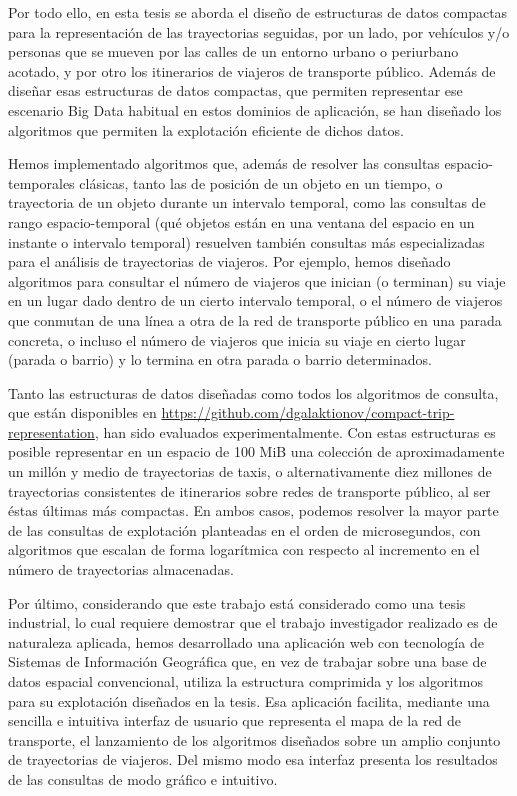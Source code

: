 Por todo ello, en esta tesis se aborda el dise\~no de estructuras de datos compactas para la representaci\'on de las trayectorias seguidas, por un lado, por veh\'iculos y/o personas que se mueven por las calles de un entorno urbano o periurbano acotado, y por otro los itinerarios de viajeros de transporte p\'ublico. Adem\'as de dise\~nar esas estructuras de datos compactas, que permiten representar ese escenario Big Data habitual en estos dominios de aplicaci\'on, se han dise\~nado los algoritmos que permiten la explotaci\'on eficiente de dichos datos.

Hemos implementado algoritmos que, adem\'as de resolver las consultas \mbox{espacio-temporales} cl\'asicas, tanto las de posici\'on de un objeto en un tiempo, o trayectoria de un objeto durante un intervalo temporal, como las consultas de rango \mbox{espacio-temporal} (qu\'e objetos est\'an en una ventana del espacio en un instante o intervalo temporal) resuelven tambi\'en consultas m\'as especializadas para el an\'alisis de trayectorias de viajeros. Por ejemplo, hemos dise\~nado algoritmos para  consultar el n\'umero de viajeros que inician (o terminan)  su viaje en un lugar dado dentro de un cierto intervalo temporal, o el n\'umero de viajeros que conmutan de una l\'inea a otra de la red de transporte p\'ublico en una parada concreta, o incluso el n\'umero de viajeros que inicia su viaje en cierto lugar (parada o  barrio) y lo termina en otra parada o barrio determinados. 

Tanto las estructuras de datos dise\~nadas como todos los algoritmos de consulta,  que  est\'an disponibles en \url{https://github.com/dgalaktionov/compact-trip-representation},  han sido evaluados experimentalmente. Con estas estructuras es posible representar en un espacio de 100 MiB una colecci\'on de aproximadamente un mill\'on y medio de trayectorias de taxis, o alternativamente diez millones de trayectorias consistentes de itinerarios sobre redes de transporte p\'ublico, al ser \'estas \'ultimas m\'as compactas. En ambos casos, podemos resolver la mayor parte de las consultas de explotaci\'on planteadas en el orden de microsegundos, con algoritmos que escalan de forma logar\'itmica con respecto al incremento en el n\'umero de trayectorias almacenadas.

Por \'ultimo, considerando que este trabajo est\'a considerado como una tesis industrial, lo cual requiere demostrar que el trabajo investigador realizado es de naturaleza aplicada, hemos desarrollado una aplicaci\'on web con tecnolog\'ia de Sistemas de Informaci\'on Geogr\'afica que, en vez de trabajar sobre una base de datos espacial convencional, utiliza la estructura comprimida y los algoritmos para su explotaci\'on dise\~nados en la tesis. Esa aplicaci\'on facilita, mediante una sencilla e intuitiva interfaz de usuario que representa el mapa de la red de transporte, el lanzamiento de los algoritmos dise\~nados sobre un amplio conjunto de trayectorias de viajeros. Del mismo modo esa interfaz presenta los resultados de las consultas de modo gr\'afico e intuitivo.

